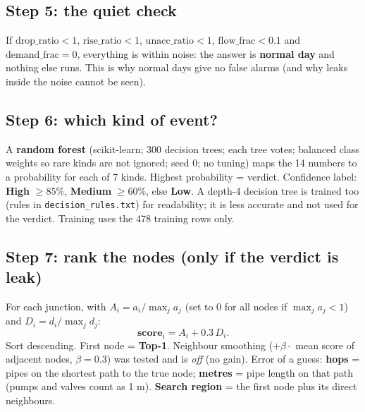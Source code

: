 \documentclass[11pt,a4paper]{article}
\newcommand{\code}[1]{\texttt{#1}}
\begin{document}
\subsection{Step 5: the quiet check}
If $\text{drop\_ratio}<1$, $\text{rise\_ratio}<1$, $\text{unacc\_ratio}<1$, $\text{flow\_frac}<0.1$ and $\text{demand\_frac}=0$, everything is within noise: the answer is \textbf{normal day} and nothing else runs. This is why normal days give no false alarms (and why leaks inside the noise cannot be seen).

\subsection{Step 6: which kind of event?}
A \textbf{random forest} (scikit-learn; 300 decision trees; each tree votes; balanced class weights so rare kinds are not ignored; seed 0; no tuning) maps the 14 numbers to a probability for each of 7 kinds. Highest probability = verdict. Confidence label: \textbf{High} $\ge85\%$, \textbf{Medium} $\ge60\%$, else \textbf{Low}. A depth-4 decision tree is trained too (rules in \code{decision\_rules.txt}) for readability; it is less accurate and not used for the verdict. Training uses the 478 training rows only.

\subsection{Step 7: rank the nodes (only if the verdict is leak)}
For each junction, with $A_i=a_i/\max_j a_j$ (set to 0 for all nodes if $\max_j a_j<1$) and $D_i=d_i/\max_j d_j$:
\[\textbf{score}_i=A_i+0.3\,D_i.\]
Sort descending. First node = \textbf{Top-1}. Neighbour smoothing ($+\beta\cdot$ mean score of adjacent nodes, $\beta=0.3$) was tested and is \emph{off} (no gain). Error of a guess: \textbf{hops} = pipes on the shortest path to the true node; \textbf{metres} = pipe length on that path (pumps and valves count as 1 m). \textbf{Search region} = the first node plus its direct neighbours.
\end{document}
